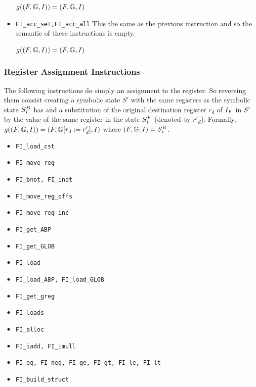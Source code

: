 \begin{itemize}
		$g((F, \mathbb{G}, I)) = (F, \mathbb{G}, I)$

	\item {\tt FI\_acc\_set,FI\_acc\_all}
		This the same as the previous instruction and so
		the semantic of these instructions is empty.
		
		$g((F, \mathbb{G}, I)) = (F, \mathbb{G}, I)$

\end{itemize}

\subsubsection{Register Assignment Instructions}
The following instructions do simply an assignment to the register.
So reversing them consist creating a symbolic state $S'$ with
the same registers as the symbolic state $S^{B}_{i}$ has
and a substitution of the original destination register $r_d$ of $I_{F}$ in $S'$
by the value of the same register in the state $S^{F}_{i}$ (denoted by $r'_d$).
Formally, $g((F, \mathbb{G}, I)) = (F, \mathbb{G} [r_{d} := r'_{d}]
			, I)$
			where $(F, \mathbb{G}, I) = S^{B}_{i}$.

\begin{itemize}

	\item {\tt FI\_load\_cst}

	\item {\tt FI\_move\_reg}

	\item {\tt FI\_bnot, FI\_inot}

	\item {\tt FI\_move\_reg\_offs}

	\item {\tt FI\_move\_reg\_inc}

	\item {\tt FI\_get\_ABP}

	\item {\tt FI\_get\_GLOB}

	\item {\tt FI\_load}
	
	\item {\tt FI\_load\_ABP, FI\_load\_GLOB}
	
	\item {\tt FI\_get\_greg}
	
	\item {\tt FI\_loads}
	
	\item {\tt FI\_alloc}

	\item {\tt FI\_iadd, FI\_imull}

	\item {\tt FI\_eq, FI\_neq, FI\_ge, FI\_gt, FI\_le, FI\_lt}
	
	\item {\tt FI\_build\_struct}

\end{itemize}

